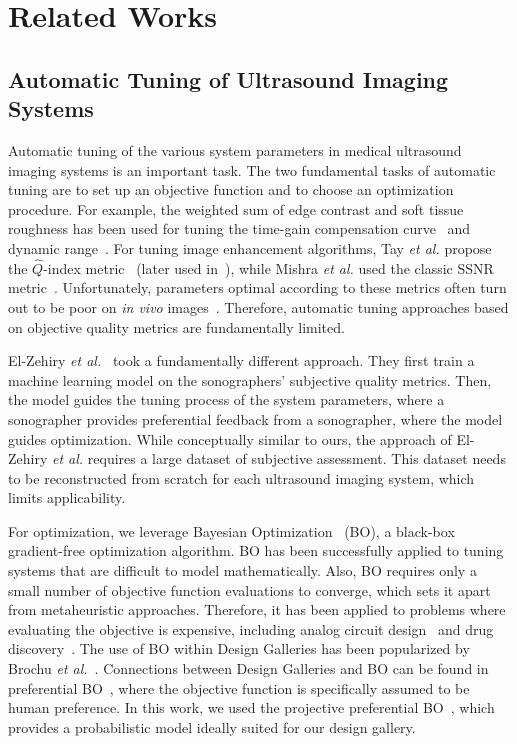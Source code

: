 
\section{Related Works}\label{section:relatedworks}
\subsection{Automatic Tuning of Ultrasound Imaging Systems}
Automatic tuning of the various system parameters in medical ultrasound imaging systems is an important task.
The two fundamental tasks of automatic tuning are to set up an objective function and to choose an optimization procedure.
For example, the weighted sum of edge contrast and soft tissue roughness has been used for tuning the time-gain compensation curve~\cite{lee_automatic_2006} and dynamic range~\cite{lee_automatic_2015}.
For tuning image enhancement algorithms, Tay \textit{et al.} propose the \(\widehat{Q}\)-index metric~\cite{tay_ultrasound_2006} (later used in~\cite{coupe_nonlocal_2009, ramos-llorden_anisotropic_2015}), while Mishra \textit{et al.} used the classic SSNR metric~\cite{mishra_edge_2018}.
Unfortunately, parameters optimal according to these metrics often turn out to be poor on \textit{in vivo} images~\cite{ramos-llorden_anisotropic_2015}.
Therefore, automatic tuning approaches based on objective quality metrics are fundamentally limited.

El-Zehiry \textit{et al.}~\cite{el-zehiry_learning_2013} took a fundamentally different approach.
They first train a machine learning model on the sonographers' subjective quality metrics.
Then, the model guides the tuning process of the system parameters, where a sonographer provides  preferential feedback from a sonographer, where the model guides optimization.
While conceptually similar to ours, the approach of El-Zehiry \textit{et al.} requires a large dataset of subjective assessment.
This dataset needs to be reconstructed from scratch for each ultrasound imaging system, which limits applicability.

For optimization, we leverage Bayesian Optimization~\cite{shahriari_taking_2016} (BO), a black-box gradient-free optimization algorithm.
BO has been successfully applied to tuning systems that are difficult to model mathematically.
Also, BO requires only a small number of objective function evaluations to converge, which sets it apart from metaheuristic approaches.
Therefore, it has been applied to problems where evaluating the objective is expensive, including analog circuit design~\cite{lyu_multiobjective_2018} and drug discovery~\cite{sano_application_2020}.
The use of BO within Design Galleries has been popularized by Brochu \textit{et al.}~\cite{NIPS2007_b6a1085a, brochu_bayesian_2010}.
Connections between Design Galleries and BO can be found in preferential BO~\cite{pmlr-v70-gonzalez17a}, where the objective function is specifically assumed to be human preference.
In this work, we used the projective preferential BO~\cite{pmlr-v119-mikkola20a}, which provides a probabilistic model ideally suited for our design gallery.

